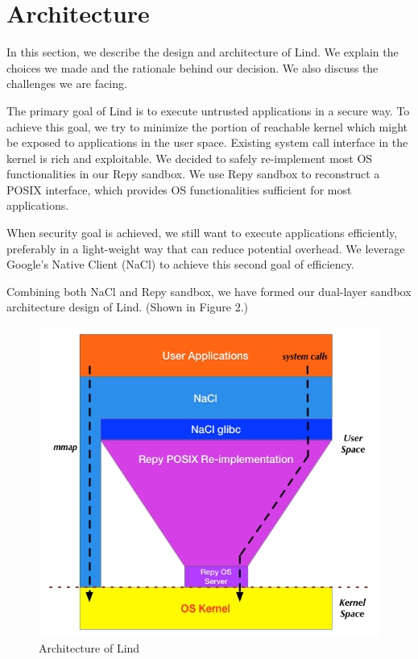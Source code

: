 \section{Architecture}
\label{sec.architecture}


\par
In this section, we describe the design and architecture of Lind. We explain the choices we made and the rationale behind our decision. We also discuss the challenges we are facing.


\par
The primary goal of Lind is to execute untrusted applications in a secure way. To achieve this goal, we try to minimize the portion of reachable kernel which might be exposed to applications in the user space. Existing system call interface in the kernel is rich and exploitable. We decided to safely re-implement most OS functionalities in our Repy sandbox. We use Repy sandbox to reconstruct a POSIX interface, which provides OS functionalities sufficient for most applications. 


\par   
When security goal is achieved, we still want to execute applications efficiently, preferably in a light-weight way that can reduce potential overhead. We leverage Google's Native Client (NaCl) to achieve this second goal of efficiency.  


\par
Combining both NaCl and Repy sandbox, we have formed our dual-layer sandbox architecture design of Lind. (Shown in Figure 2.)  


\begin{figure}[h]
\centering
\includegraphics[width=1.0\columnwidth]{diagram/lind_architecture.png}
\caption{Architecture of Lind}
\label{fig:arch}
\end{figure}


